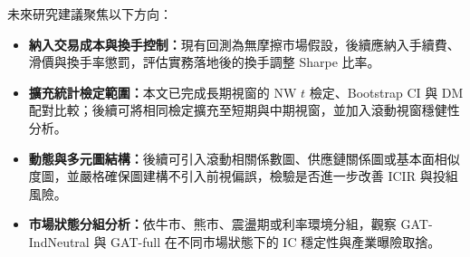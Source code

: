 \noindent 未來研究建議聚焦以下方向：

\begin{itemize}
  \item \textbf{納入交易成本與換手控制：}現有回測為無摩擦市場假設，後續應納入手續費、滑價與換手率懲罰，評估實務落地後的換手調整 Sharpe 比率。
  \item \textbf{擴充統計檢定範圍：}本文已完成長期視窗的 NW $t$ 檢定、Bootstrap CI 與 DM 配對比較；後續可將相同檢定擴充至短期與中期視窗，並加入滾動視窗穩健性分析。
  \item \textbf{動態與多元圖結構：}後續可引入滾動相關係數圖、供應鏈關係圖或基本面相似度圖，並嚴格確保圖建構不引入前視偏誤，檢驗是否進一步改善 ICIR 與投組風險。
  \item \textbf{市場狀態分組分析：}依牛市、熊市、震盪期或利率環境分組，觀察 GAT-IndNeutral 與 GAT-full 在不同市場狀態下的 IC 穩定性與產業曝險取捨。
\end{itemize}
